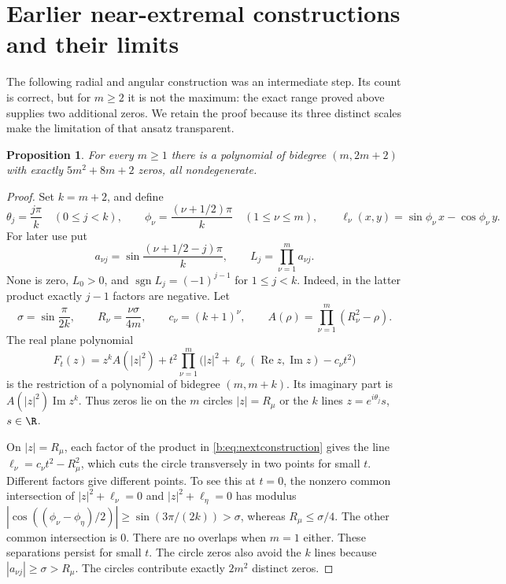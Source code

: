 \documentclass[UTF8,11pt]{ctexart}
\newtheorem{prop}[thm]{Proposition}
\theoremstyle{definition}
\numberwithin{equation}{section}
\DeclareMathOperator{\Rea}{Re}\DeclareMathOperator{\Ima}{Im}
\DeclareMathOperator{\sgn}{sgn}\DeclareMathOperator{\wind}{wind}
\begin{document}
\section{Earlier near-extremal constructions and their limits}\label{core:near}
The following radial and angular construction was an intermediate step.
Its count is correct, but for $m\ge2$ it is not the maximum: the exact
range proved above supplies two additional zeros. We retain the proof
because its three distinct scales make the limitation of that ansatz
transparent.
\begin{prop}\label{b:prop:nextdiagonal}
For every $m\ge1$ there is a polynomial of bidegree $(m,2m+2)$
with exactly $5m^2+8m+2$ zeros, all nondegenerate.
\end{prop}
\begin{proof}
Set $k=m+2$, and define
\[
 \theta_j=\frac{j\pi}{k}\quad(0\le j<k),\qquad
 \phi_\nu=\frac{(\nu+1/2)\pi}{k}\quad(1\le\nu\le m),
 \qquad
 \ell_\nu(x,y)=\sin\phi_\nu\,x-\cos\phi_\nu\,y.
\]
For later use put
\begin{equation}\label{b:eq:linesigns}
 a_{\nu j}=\sin\frac{(\nu+1/2-j)\pi}{k},\qquad
 L_j=\prod_{\nu=1}^m a_{\nu j}.
\end{equation}
None is zero, $L_0>0$, and $\sgn L_j=(-1)^{j-1}$ for $1\le j<k$.
Indeed, in the latter product exactly $j-1$ factors are negative.
Let
\[
 \sigma=\sin\frac\pi{2k},\qquad
 R_\nu=\frac{\nu\sigma}{4m},\qquad c_\nu=(k+1)^\nu,
 \qquad A(\rho)=\prod_{\nu=1}^m(R_\nu^2-\rho).
\]
The real plane polynomial
\begin{equation}\label{b:eq:nextconstruction}
 F_t(z)=z^kA(|z|^2)+t^2
 \prod_{\nu=1}^m\bigl(|z|^2+\ell_\nu(\Rea z,\Ima z)-c_\nu t^2\bigr)
\end{equation}
is the restriction of a polynomial of bidegree $(m,m+k)$.
Its imaginary part is $A(|z|^2)\Ima z^k$. Thus zeros lie on the
$m$ circles $|z|=R_\mu$ or the $k$ lines $z=e^{i\theta_j}s$,
$s\in\R$.

On $|z|=R_\mu$, each factor of the product in
\eqref{b:eq:nextconstruction} gives the line
$\ell_\nu=c_\nu t^2-R_\mu^2$, which cuts the circle transversely
in two points for small $t$. Different factors give different points.
To see this at $t=0$, the nonzero common intersection of
$|z|^2+\ell_\nu=0$ and $|z|^2+\ell_\eta=0$ has modulus
$|\cos((\phi_\nu-\phi_\eta)/2)|\ge\sin(3\pi/(2k))>\sigma$,
whereas $R_\mu\le\sigma/4$. The other common intersection is $0$.
There are no overlaps when $m=1$ either. These separations persist
for small $t$. The circle zeros also avoid the $k$ lines because
$|a_{\nu j}|\ge\sigma>R_\mu$. The circles contribute exactly
$2m^2$ distinct zeros.


\end{proof}
\end{document}
